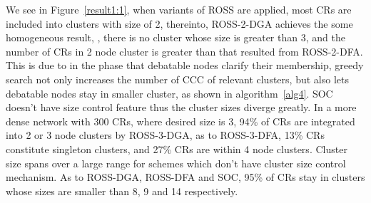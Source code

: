 
We see in Figure~\ref{result1:1}, when variants of ROSS are applied, most CRs are included into clusters with size of 2, thereinto, ROSS-2-DGA achieves the some homogeneous result, \ie, there is no cluster whose size is greater than 3, and the number of CRs in 2 node cluster is greater than that resulted from ROSS-2-DFA.
This is due to in the phase that debatable nodes clarify their membership, greedy search not only increases the number of CCC of relevant clusters, but also lets debatable nodes stay in smaller cluster, as shown in algorithm~\ref{alg4}.
SOC doesn't have size control feature thus the cluster sizes diverge greatly.
In a more dense network with 300 CRs, where desired size is 3, 94\% of CRs are integrated into 2 or 3 node clusters by ROSS-3-DGA, as to ROSS-3-DFA, 13\% CRs constitute singleton clusters, and 27\% CRs are within 4 node clusters.
Cluster size spans over a large range for schemes which don't have cluster size control mechanism.
As to ROSS-DGA, ROSS-DFA and SOC, 95\% of CRs stay in clusters whose sizes are smaller than 8, 9 and 14 respectively.



